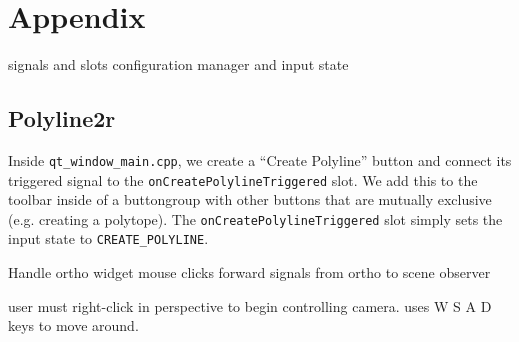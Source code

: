 
\section{Appendix}

signals and slots
configuration manager and input state

\subsection{Polyline2r}

Inside \texttt{qt\_window\_main.cpp}, we create a ``Create Polyline'' button and
connect its triggered signal to the \texttt{onCreatePolylineTriggered} slot. We
add this to the toolbar inside of a buttongroup with other buttons that are
mutually exclusive (e.g. creating a polytope). The
\texttt{onCreatePolylineTriggered} slot simply sets the input state to
\texttt{CREATE\_POLYLINE}.



Handle ortho widget mouse clicks
forward signals from ortho to scene observer

user must right-click in perspective to begin controlling camera. uses W S A D
keys to move around.


